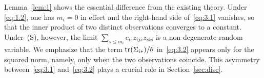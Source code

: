 \begin{remark}
\label{rem:1}
Lemma~\ref{lem:1} shows the essential difference from the existing theory. Under
\eqref{eq:1.2}, one has $m_i=0$ in effect and the right-hand side of~\eqref{eq:3.1}
vanishes, so that the inner product of two distinct observations converges to a
constant. Under~(S), however, the limit $\sum_{s\le m_i}c_{is}z_{ijs}z_{iks}$ is a
non-degenerate random variable. We emphasize that the term
$\operatorname{tr}(\Sigma_{i*})/\theta$ in~\eqref{eq:3.2} appears only for the squared norm,
namely, only when the two observations coincide. This asymmetry
between~\eqref{eq:3.1} and~\eqref{eq:3.2} plays a crucial role in
Section~\ref{sec:disc}.
\end{remark}

